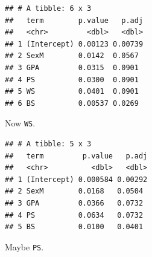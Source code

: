 \documentclass[
]{book}
\newenvironment{Shaded}{\begin{snugshade}}{\end{snugshade}}
\newcommand{\DataTypeTok}[1]{\textcolor[rgb]{0.13,0.29,0.53}{#1}}
\newcommand{\KeywordTok}[1]{\textcolor[rgb]{0.13,0.29,0.53}{\textbf{#1}}}
\newcommand{\NormalTok}[1]{#1}
\newcommand{\OperatorTok}[1]{\textcolor[rgb]{0.81,0.36,0.00}{\textbf{#1}}}
\newcommand{\StringTok}[1]{\textcolor[rgb]{0.31,0.60,0.02}{#1}}
\begin{document}
\begin{verbatim}
## # A tibble: 6 x 3
##   term        p.value   p.adj
##   <chr>         <dbl>   <dbl>
## 1 (Intercept) 0.00123 0.00739
## 2 SexM        0.0142  0.0567 
## 3 GPA         0.0315  0.0901 
## 4 PS          0.0300  0.0901 
## 5 WS          0.0401  0.0901 
## 6 BS          0.00537 0.0269
\end{verbatim}

Now \texttt{WS}.

\begin{Shaded}
\end{Shaded}

\begin{verbatim}
## # A tibble: 5 x 3
##   term         p.value   p.adj
##   <chr>          <dbl>   <dbl>
## 1 (Intercept) 0.000584 0.00292
## 2 SexM        0.0168   0.0504 
## 3 GPA         0.0366   0.0732 
## 4 PS          0.0634   0.0732 
## 5 BS          0.0100   0.0401
\end{verbatim}

Maybe \texttt{PS}.

\begin{Shaded}
\end{Shaded}
\end{document}
